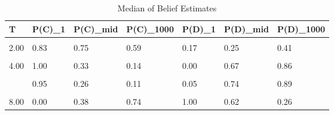 \begin{table}[!h]
\centering
\caption{Median of Belief Estimates}
\centering
\begin{tabular}[t]{lllllll}
\toprule
T & P(C)\_1 & P(C)\_mid & P(C)\_1000 & P(D)\_1 & P(D)\_mid & P(D)\_1000\\
\midrule
\cellcolor{gray!10}{1.00} & \cellcolor{gray!10}{1.00} & \cellcolor{gray!10}{0.28} & \cellcolor{gray!10}{0.26} & \cellcolor{gray!10}{0.00} & \cellcolor{gray!10}{0.72} & \cellcolor{gray!10}{0.74}\\
2.00 & 0.83 & 0.75 & 0.59 & 0.17 & 0.25 & 0.41\\
\cellcolor{gray!10}{3.00} & \cellcolor{gray!10}{0.97} & \cellcolor{gray!10}{0.11} & \cellcolor{gray!10}{0.10} & \cellcolor{gray!10}{0.03} & \cellcolor{gray!10}{0.89} & \cellcolor{gray!10}{0.90}\\
4.00 & 1.00 & 0.33 & 0.14 & 0.00 & 0.67 & 0.86\\
\cellcolor{gray!10}{5.00} & \cellcolor{gray!10}{0.99} & \cellcolor{gray!10}{0.28} & \cellcolor{gray!10}{0.08} & \cellcolor{gray!10}{0.01} & \cellcolor{gray!10}{0.72} & \cellcolor{gray!10}{0.92}\\
\addlinespace
6.00 & 0.95 & 0.26 & 0.11 & 0.05 & 0.74 & 0.89\\
\cellcolor{gray!10}{7.00} & \cellcolor{gray!10}{0.00} & \cellcolor{gray!10}{0.22} & \cellcolor{gray!10}{0.76} & \cellcolor{gray!10}{1.00} & \cellcolor{gray!10}{0.78} & \cellcolor{gray!10}{0.24}\\
8.00 & 0.00 & 0.38 & 0.74 & 1.00 & 0.62 & 0.26\\
\bottomrule
\end{tabular}
\end{table}
